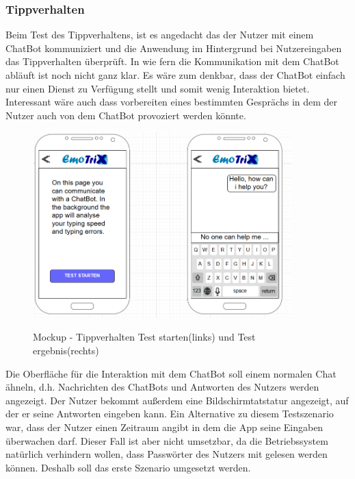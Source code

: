 \subsubsection{Tippverhalten}
Beim Test des Tippverhaltens, ist es angedacht das der Nutzer mit einem ChatBot kommuniziert und die Anwendung im Hintergrund bei Nutzereingaben das Tippverhalten überprüft. In wie fern die Kommunikation mit dem ChatBot abläuft ist noch nicht ganz klar. Es wäre zum denkbar, dass der ChatBot einfach nur einen Dienst zu Verfügung stellt und somit wenig Interaktion bietet. Interessant wäre auch dass vorbereiten eines bestimmten Gesprächs in dem der Nutzer auch von dem ChatBot provoziert werden könnte.
\begin{figure}[h]
	\centering
	\includegraphics[width=10cm]{Bilder/Mockup-Tippverhalten.png}
	\label{img:Mockup-Tippverhalten}
	\caption[Mockup - Tippverhalten Test starten(links) und Test ergebnis(rechts)]{Mockup - Tippverhalten Test starten(links) und Test ergebnis(rechts)}
\end{figure}%
Die Oberfläche für die Interaktion mit dem ChatBot soll einem normalen Chat ähneln, d.h. Nachrichten des ChatBots und Antworten des Nutzers werden angezeigt. Der Nutzer bekommt außerdem eine Bildschirmtatstatur angezeigt, auf der er seine Antworten eingeben kann.\newline
Ein Alternative zu diesem Testszenario war, dass der Nutzer einen Zeitraum angibt in dem die App seine Eingaben überwachen darf. Dieser Fall ist aber nicht umsetzbar, da die Betriebssystem natürlich verhindern wollen, dass Passwörter des Nutzers mit gelesen werden können.
Deshalb soll das erste Szenario umgesetzt werden.
